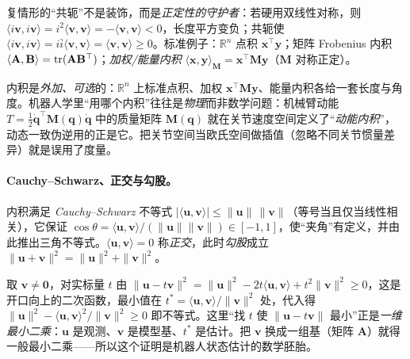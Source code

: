 \noindent 复情形的“共轭”不是装饰，而是\emph{正定性的守护者}：若硬用双线性对称，则 $\langle i\mathbf{v},i\mathbf{v}\rangle=i^2\langle\mathbf{v},\mathbf{v}\rangle=-\langle\mathbf{v},\mathbf{v}\rangle<0$，长度平方变负；共轭使 $\langle i\mathbf{v},i\mathbf{v}\rangle=i\bar{i}\langle\mathbf{v},\mathbf{v}\rangle=\langle\mathbf{v},\mathbf{v}\rangle\ge0$。标准例子：$\mathbb{R}^n$ 点积 $\mathbf{x}^\top\mathbf{y}$；矩阵 Frobenius 内积 $\langle\mathbf{A},\mathbf{B}\rangle=\operatorname{tr}(\mathbf{A}\mathbf{B}^\top)$；\emph{加权/能量内积} $\langle\mathbf{x},\mathbf{y}\rangle_{\mathbf{M}}=\mathbf{x}^\top\mathbf{M}\mathbf{y}$（$\mathbf{M}$ 对称正定）。

\begin{insight}
内积是\emph{外加、可选}的：$\mathbb{R}^n$ 上标准点积、加权 $\mathbf{x}^\top\mathbf{M}\mathbf{y}$、能量内积各给一套长度与角度。机器人学里“用哪个内积”往往是\emph{物理}而非数学问题：机械臂动能 $T=\tfrac12\dot{\mathbf{q}}^\top\mathbf{M}(\mathbf{q})\dot{\mathbf{q}}$ 中的质量矩阵 $\mathbf{M}(\mathbf{q})$ 就在关节速度空间定义了“\emph{动能内积}”，动态一致伪逆用的正是它。把关节空间当欧氏空间做插值（忽略不同关节惯量差异）就是误用了度量。
\end{insight}

\paragraph{Cauchy--Schwarz、正交与勾股。}
内积满足 \emph{Cauchy--Schwarz} 不等式 $|\langle\mathbf{u},\mathbf{v}\rangle|\le\|\mathbf{u}\|\,\|\mathbf{v}\|$（等号当且仅当线性相关），它保证 $\cos\theta=\langle\mathbf{u},\mathbf{v}\rangle/(\|\mathbf{u}\|\|\mathbf{v}\|)\in[-1,1]$，使“夹角”有定义，并由此推出三角不等式。$\langle\mathbf{u},\mathbf{v}\rangle=0$ 称\emph{正交}，此时\emph{勾股}成立 $\|\mathbf{u}+\mathbf{v}\|^2=\|\mathbf{u}\|^2+\|\mathbf{v}\|^2$。

\begin{insight}
取 $\mathbf{v}\neq\mathbf{0}$，对实标量 $t$ 由 $\|\mathbf{u}-t\mathbf{v}\|^2=\|\mathbf{u}\|^2-2t\langle\mathbf{u},\mathbf{v}\rangle+t^2\|\mathbf{v}\|^2\ge0$，这是开口向上的二次函数，最小值在 $t^*=\langle\mathbf{u},\mathbf{v}\rangle/\|\mathbf{v}\|^2$ 处，代入得 $\|\mathbf{u}\|^2-\langle\mathbf{u},\mathbf{v}\rangle^2/\|\mathbf{v}\|^2\ge0$ 即不等式。这里“找 $t$ 使 $\|\mathbf{u}-t\mathbf{v}\|$ 最小”正是\emph{一维最小二乘}：$\mathbf{u}$ 是观测、$\mathbf{v}$ 是模型基、$t^*$ 是估计。把 $\mathbf{v}$ 换成一组基（矩阵 $\mathbf{A}$）就得一般最小二乘——所以这个证明是机器人状态估计的数学胚胎。
\end{insight}

